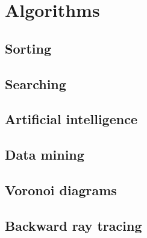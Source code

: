 \chapter{Algorithms}\label{chapter:algorithms}

\section{Sorting}
\section{Searching}
\section{Artificial intelligence}
\section{Data mining}
\section{Voronoi diagrams}
\section{Backward ray tracing}

